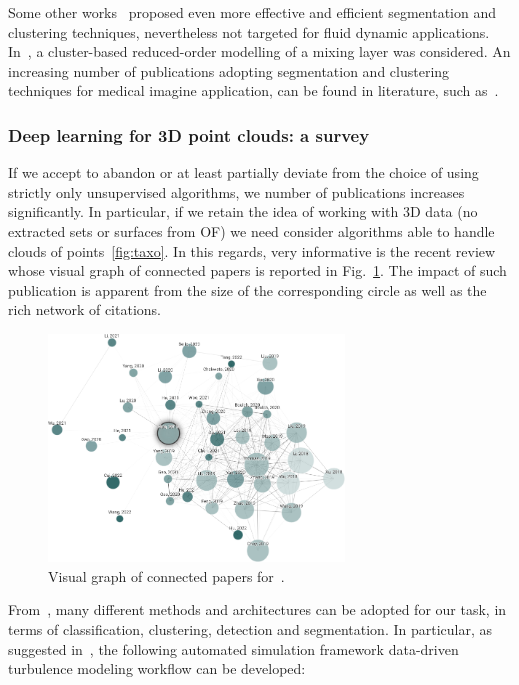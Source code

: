 %
Some other works~\cite{van2021unsupervised,hamilton2022unsupervised,ji2019invariant,caron2018deep} proposed even more effective and efficient segmentation and clustering techniques, nevertheless not targeted for fluid dynamic applications. In~\cite{kaiser2014cluster}, a cluster-based reduced-order modelling of a mixing layer was considered. An increasing number of publications adopting segmentation and clustering techniques for medical imagine application, can be found in literature, such as~\cite{colebank2019influence}.

\subsubsection{Deep learning for 3D point clouds: a survey~\cite{guo2020deep}}
If we accept to abandon or at least partially deviate from the choice of using strictly only unsupervised algorithms, we number of publications increases significantly. In particular, if we retain the idea of working with 3D data (no extracted sets or surfaces from OF) we need consider algorithms able to handle clouds of points~\ref{fig:taxo}. In this regards, very informative is the recent review~\cite{guo2020deep} whose visual graph of connected papers is reported in Fig.~\ref{fig:guo}. The impact of such publication is apparent from the size of the corresponding circle as well as the rich network of citations.
%
\begin{figure}[H]%
    \centering
    \includegraphics[width=0.7\textwidth]{figs/guo.png}
    \caption{Visual graph of connected papers for~\cite{guo2020deep}.}
    \label{fig:guo}%
\end{figure}
%
\noindent From~\cite{guo2020deep}, many different methods and architectures can be adopted for our task, in terms of classification, clustering, detection and segmentation. In particular, as suggested in~\cite{sun2021automated}, the following automated simulation framework data-driven turbulence modeling workflow can be developed:
